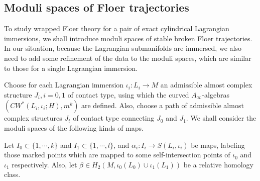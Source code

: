 \documentclass{amsart}
\numberwithin{equation}{section}
\numberwithin{figure}{section}
\begin{document}
\subsection{Moduli spaces of Floer trajectories}
	To study wrapped Floer theory for a pair of exact cylindrical Lagrangian immersions, we shall introduce moduli spaces of stable broken Floer trajectories. In our situation, because the Lagrangian submanifolds are immersed, we also need to add some refinement of the data to the moduli spaces, which are similar to those for a single Lagrangian immersion. \par
	Choose for each Lagrangian immersion $\iota_{i}: L_{i} \to M$ an admissible almost complex structure $J_{i}, i = 0, 1$ of contact type, using which the curved $A_{\infty}$-algebras $(CW^{*}(L_{i}, \iota_{i}; H), m^{k})$ are defined. Also, choose a path of admissible almost complex structures $J_{t}$ of contact type connecting $J_{0}$ and $J_{1}$. We shall consider the moduli spaces of the following kinds of maps. \par
	Let $I_{0} \subset \{1, \cdots, k\}$ and $I_{1} \subset \{1, \cdots, l\}$, and $\alpha_{i}: I_{i} \to S(L_{i}, \iota_{i})$ be maps, labeling those marked points which are mapped to some self-intersection points of $\iota_{0}$ and $\iota_{1}$ respectively. Also, let $\beta \in H_{2}(M, \iota_{0}(L_{0}) \cup \iota_{1}(L_{1}))$ be a relative homology class. \par
\end{document}

